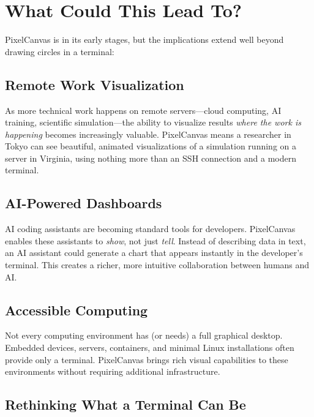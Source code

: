 \documentclass[12pt, a4paper]{article}
\begin{document}
\section{What Could This Lead To?}

PixelCanvas is in its early stages, but the implications extend well beyond drawing circles in a terminal:

\subsection{Remote Work Visualization}

As more technical work happens on remote servers---cloud computing, AI training, scientific simulation---the ability to visualize results \emph{where the work is happening} becomes increasingly valuable. PixelCanvas means a researcher in Tokyo can see beautiful, animated visualizations of a simulation running on a server in Virginia, using nothing more than an SSH connection and a modern terminal.

\subsection{AI-Powered Dashboards}

AI coding assistants are becoming standard tools for developers. PixelCanvas enables these assistants to \emph{show}, not just \emph{tell}. Instead of describing data in text, an AI assistant could generate a chart that appears instantly in the developer's terminal. This creates a richer, more intuitive collaboration between humans and AI.

\subsection{Accessible Computing}

Not every computing environment has (or needs) a full graphical desktop. Embedded devices, servers, containers, and minimal Linux installations often provide only a terminal. PixelCanvas brings rich visual capabilities to these environments without requiring additional infrastructure.

\subsection{Rethinking What a Terminal Can Be}
\end{document}
